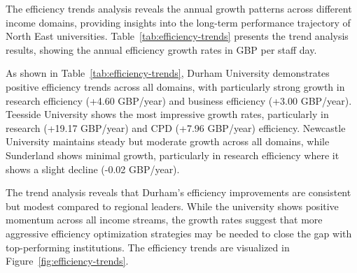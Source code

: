 \documentclass[journal,onecolumn, 10pt,draftclsnofoot]{IEEEtran}
\begin{document}
The efficiency trends analysis reveals the annual growth patterns across different income domains, providing insights into the long-term performance trajectory of North East universities. Table~\ref{tab:efficiency-trends} presents the trend analysis results, showing the annual efficiency growth rates in GBP per staff day.
\vspace{0.2cm}
\begin{table}[h]
\centering
\caption{Efficiency Trends Analysis - North East Universities (GBP per staff day per year)}
\vspace{0.1cm}
\label{tab:efficiency-trends}
\end{table}

As shown in Table~\ref{tab:efficiency-trends}, Durham University demonstrates positive efficiency trends across all domains, with particularly strong growth in research efficiency (+4.60 GBP/year) and business efficiency (+3.00 GBP/year). Teesside University shows the most impressive growth rates, particularly in research (+19.17 GBP/year) and CPD (+7.96 GBP/year) efficiency. Newcastle University maintains steady but moderate growth across all domains, while Sunderland shows minimal growth, particularly in research efficiency where it shows a slight decline (-0.02 GBP/year).

The trend analysis reveals that Durham's efficiency improvements are consistent but modest compared to regional leaders. While the university shows positive momentum across all income streams, the growth rates suggest that more aggressive efficiency optimization strategies may be needed to close the gap with top-performing institutions. The efficiency trends are visualized in Figure~\ref{fig:efficiency-trends}.
\end{document}
